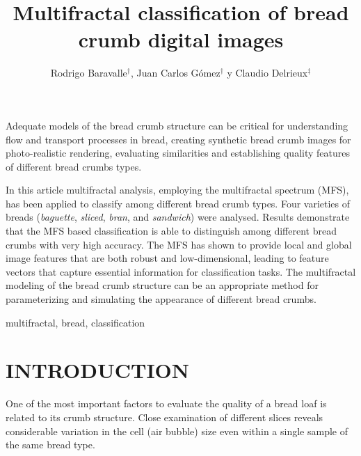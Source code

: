 \documentclass[a4paper,10pt]{article}
\affiliation{
\dag Laboratorio de Sistemas Din\'amicos y Procesamiento de Informaci\'on \\
     FCEIA, Universidad Nacional de Rosario, - CIFASIS - CONICET \\
     \{baravalle,gomez\}@cifasis-conicet.gov.ar \\
\ddag DIEC, Universidad Nacional del Sur - IIIE-CONICET \\
    {\ cad@uns.edu.ar}
}
\begin{document}
\title{Multifractal classification of bread crumb digital images}
\author{Rodrigo Baravalle$^{\dag }$, Juan Carlos G\'omez$^{\dag }$ y Claudio Delrieux$^{\ddag }$}
\maketitle


\balance

\abstract
Adequate models of the bread crumb structure can be critical for understanding flow and transport
processes in bread, creating synthetic bread crumb images for photo-realistic rendering, evaluating similarities and establishing quality features of different bread crumbs types.

In this article multifractal analysis, employing the multifractal spectrum (MFS), has been applied to classify among different bread crumb types. Four varieties of breads ({\em baguette}, {\em sliced}, {\em bran}, and {\em sandwich}) were analysed. Results demonstrate that the MFS based classification is able to distinguish among different bread crumbs with very high accuracy. The MFS has shown to provide local and global image features that are both robust and low-dimensional, leading to feature vectors that capture essential information for classification tasks. The multifractal modeling of the bread crumb structure can be an appropriate method for parameterizing and simulating the appearance of different bread crumbs.
\endabstract

\keywords
multifractal, bread, classification
\endpalabras

\section{INTRODUCTION}
One of the most important factors to evaluate the quality of a bread loaf is related to its crumb structure. Close examination of different slices reveals considerable variation in the cell (air bubble) size even within a single sample of the same bread type. 
\end{document}
